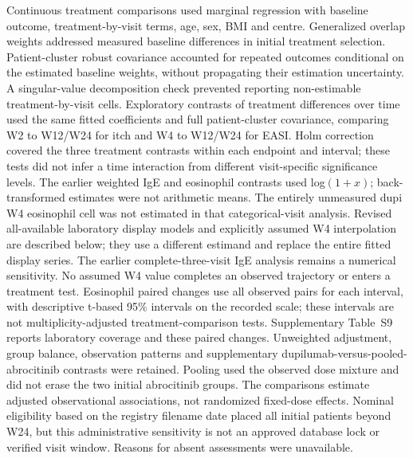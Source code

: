\documentclass[10pt,a4paper]{article}
\begin{document}
Continuous treatment comparisons used marginal regression with baseline outcome, treatment-by-visit terms, age, sex, BMI and centre. Generalized overlap weights addressed measured baseline differences in initial treatment selection. Patient-cluster robust covariance accounted for repeated outcomes conditional on the estimated baseline weights, without propagating their estimation uncertainty. A singular-value decomposition check prevented reporting non-estimable treatment-by-visit cells. Exploratory contrasts of treatment differences over time used the same fitted coefficients and full patient-cluster covariance, comparing W2 to W12/W24 for itch and W4 to W12/W24 for EASI. Holm correction covered the three treatment contrasts within each endpoint and interval; these tests did not infer a time interaction from different visit-specific significance levels. The earlier weighted IgE and eosinophil contrasts used log$(1+x)$; back-transformed estimates were not arithmetic means. The entirely unmeasured dupi W4 eosinophil cell was not estimated in that categorical-visit analysis. Revised all-available laboratory display models and explicitly assumed W4 interpolation are described below; they use a different estimand and replace the entire fitted display series. The earlier complete-three-visit IgE analysis remains a numerical sensitivity. No assumed W4 value completes an observed trajectory or enters a treatment test. Eosinophil paired changes use all observed pairs for each interval, with descriptive t-based 95\% intervals on the recorded scale; these intervals are not multiplicity-adjusted treatment-comparison tests. Supplementary Table~S9 reports laboratory coverage and these paired changes. Unweighted adjustment, group balance, observation patterns and supplementary dupilumab-versus-pooled-abrocitinib contrasts were retained. Pooling used the observed dose mixture and did not erase the two initial abrocitinib groups. The comparisons estimate adjusted observational associations, not randomized fixed-dose effects. Nominal eligibility based on the registry filename date placed all initial patients beyond W24, but this administrative sensitivity is not an approved database lock or verified visit window. Reasons for absent assessments were unavailable.
\end{document}
